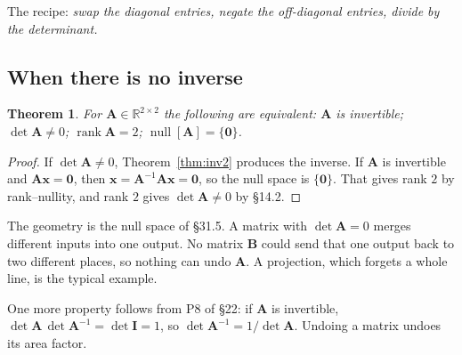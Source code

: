 \documentclass[11pt]{article}
\theoremstyle{plain}
\newtheorem{thm}{Theorem}[section]
\theoremstyle{definition}
\theoremstyle{remark}
\newcommand{\R}{\mathbb{R}}
\newcommand{\vc}[1]{\mathbf{#1}}
\newcommand{\mt}[1]{\mathbf{#1}}
\newcommand{\nullsp}[1]{\operatorname{null}[#1]}
\DeclareMathOperator{\rank}{rank}
\begin{document}
\noindent The recipe: \emph{swap the diagonal entries, negate the off-diagonal
entries, divide by the determinant.}

\subsection{When there is no inverse}
\begin{thm}
\label{thm:inv2iff}
For $\mt{A}\in\R^{2\times2}$ the following are equivalent:
$\mt{A}$ is invertible; $\det\mt{A}\neq0$; $\rank\mt{A}=2$;
$\nullsp{\mt{A}}=\{\vc{0}\}$.
\end{thm}

\begin{proof}
If $\det\mt{A}\neq0$, Theorem~\ref{thm:inv2} produces the inverse. If $\mt{A}$
is invertible and $\mt{A}\vc{x}=\vc{0}$, then
$\vc{x}=\mt{A}^{-1}\mt{A}\vc{x}=\vc{0}$, so the null space is $\{\vc{0}\}$. That
gives rank $2$ by rank--nullity, and rank $2$ gives $\det\mt{A}\neq0$ by \S14.2.
\end{proof}

\noindent The geometry is the null space of \S31.5. A matrix with
$\det\mt{A}=0$ merges different inputs into one output. No matrix $\mt{B}$ could
send that one output back to two different places, so nothing can undo
$\mt{A}$. A projection, which forgets a whole line, is the typical example.

\noindent One more property follows from P8 of \S22: if $\mt{A}$ is invertible,
$\det\mt{A}\,\det\mt{A}^{-1}=\det\mt{I}=1$, so
$\det\mt{A}^{-1}=1/\det\mt{A}$. Undoing a matrix undoes its area factor.

\end{document}
